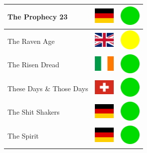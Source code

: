 \documentclass[12pt, a4paper, twoside]{report}
\begin{document}
\begin{center}
\begin{longtable}{|p{5cm}|p{2cm}|p{2cm}|}
 The Prophecy 23                                            & \includegraphics[width=1cm]{../4x3/de} &   \includegraphics[width=1cm]{../likes/y} \\ \hline
 The Raven Age                                              & \includegraphics[width=1cm]{../4x3/gb} &   \includegraphics[width=1cm]{../likes/m} \\ \hline
 The Risen Dread                                            & \includegraphics[width=1cm]{../4x3/ie} &   \includegraphics[width=1cm]{../likes/y} \\ \hline
 These Days \& Those Days                                   & \includegraphics[width=1cm]{../4x3/ch} &   \includegraphics[width=1cm]{../likes/y} \\ \hline
 The Shit Shakers                                           & \includegraphics[width=1cm]{../4x3/de} &   \includegraphics[width=1cm]{../likes/y} \\ \hline
 The Spirit                                                 & \includegraphics[width=1cm]{../4x3/de} &   \includegraphics[width=1cm]{../likes/y} \\ \hline

\end{longtable}
\end{center}
\end{document}
